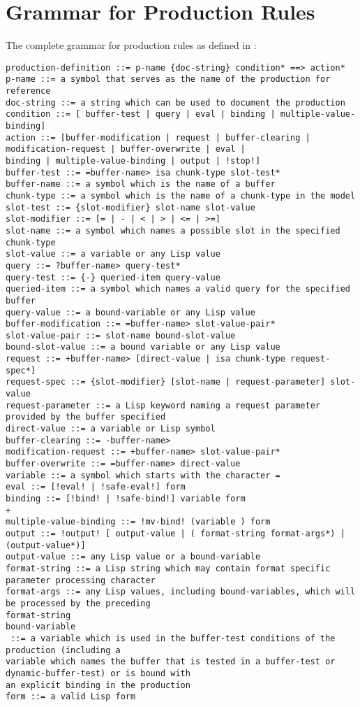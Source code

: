 \chapter{Grammar for Production Rules}

The complete grammar for production rules as defined in \cite{actr_reference}:

\begin{lstlisting}
production-definition ::= p-name {doc-string} condition* ==> action*
p-name ::= a symbol that serves as the name of the production for reference
doc-string ::= a string which can be used to document the production
condition ::= [ buffer-test | query | eval | binding | multiple-value-binding]
action ::= [buffer-modification | request | buffer-clearing | modification-request | buffer-overwrite | eval |
binding | multiple-value-binding | output | !stop!]
buffer-test ::= =buffer-name> isa chunk-type slot-test*
buffer-name ::= a symbol which is the name of a buffer
chunk-type ::= a symbol which is the name of a chunk-type in the model
slot-test ::= {slot-modifier} slot-name slot-value
slot-modifier ::= [= | - | < | > | <= | >=]
slot-name ::= a symbol which names a possible slot in the specified chunk-type
slot-value ::= a variable or any Lisp value
query ::= ?buffer-name> query-test*
query-test ::= {-} queried-item query-value
queried-item ::= a symbol which names a valid query for the specified buffer
query-value ::= a bound-variable or any Lisp value
buffer-modification ::= =buffer-name> slot-value-pair*
slot-value-pair ::= slot-name bound-slot-value
bound-slot-value ::= a bound variable or any Lisp value
request ::= +buffer-name> [direct-value | isa chunk-type request-spec*]
request-spec ::= {slot-modifier} [slot-name | request-parameter] slot-value
request-parameter ::= a Lisp keyword naming a request parameter provided by the buffer specified
direct-value ::= a variable or Lisp symbol
buffer-clearing ::= -buffer-name>
modification-request ::= +buffer-name> slot-value-pair*
buffer-overwrite ::= =buffer-name> direct-value
variable ::= a symbol which starts with the character =
eval ::= [!eval! | !safe-eval!] form
binding ::= [!bind! | !safe-bind!] variable form
+
multiple-value-binding ::= !mv-bind! (variable ) form
output ::= !output! [ output-value | ( format-string format-args*) | (output-value*)]
output-value ::= any Lisp value or a bound-variable
format-string ::= a Lisp string which may contain format specific parameter processing character
format-args ::= any Lisp values, including bound-variables, which will be processed by the preceding
format-string
bound-variable
 ::= a variable which is used in the buffer-test conditions of the production (including a
variable which names the buffer that is tested in a buffer-test or dynamic-buffer-test) or is bound with
an explicit binding in the production
form ::= a valid Lisp form
\end{lstlisting}